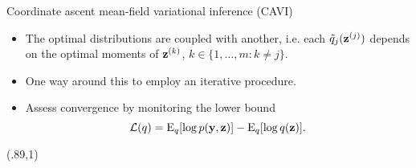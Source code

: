 \begin{frame}[label=cavi]{Coordinate ascent mean-field variational inference (CAVI)}
  \vspace{-5pt}
  \begin{itemize}\setlength\itemsep{0.4em}
    \item The optimal distributions are coupled with another, i.e. each $\tilde q_j({\mathbf z}^{(j)})$ depends on the optimal moments of ${\mathbf z}^{(k)}$, $k \in \{1,\dots,m:k \neq j\}$.
    \item One way around this to employ an iterative procedure.
    \item Assess convergence by monitoring the lower bound
    \[
      {\mathcal L}(q) = \operatorname{E}_{ q}[\log p({\mathbf y}, {\mathbf z})] - \operatorname{E}_{ q}[\log q({\mathbf z})].
    \]
  \end{itemize}
  \vspace{-12pt}
    \begin{center}
  \end{center}
  
  \begin{textblock*}{3cm}(.89\textwidth,1\textheight)%
    \hyperlink{varex}{}      
  \end{textblock*}
\end{frame}
